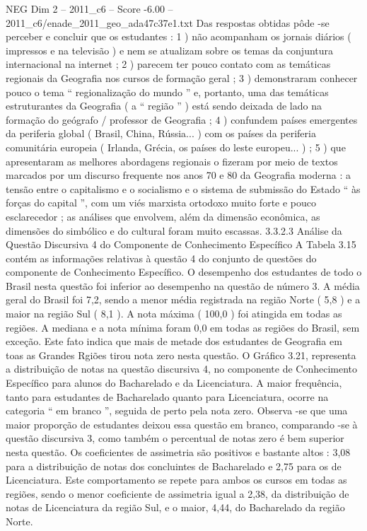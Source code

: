\begin{textsample}{NEG Dim 2 – 2011\_c6 – Score -6.00 – 2011\_c6/enade\_2011\_geo\_ada47c37e1.txt}
Das respostas obtidas pôde -se perceber e concluir que os estudantes : 1 ) não acompanham os jornais diários ( impressos e na televisão ) e nem se atualizam sobre os temas da conjuntura internacional na internet ; 2 ) parecem ter pouco contato com as temáticas regionais da Geografia nos cursos de formação geral ; 3 ) demonstraram conhecer pouco o tema “ regionalização do mundo ” e, portanto, uma das temáticas estruturantes da Geografia ( a “ região ” ) está sendo deixada de lado na formação do geógrafo / professor de Geografia ; 4 ) confundem países emergentes da periferia global ( Brasil, China, Rússia... ) com os países da periferia comunitária europeia ( Irlanda, Grécia, os países do leste europeu... ) ; 5 ) que apresentaram as melhores abordagens regionais o fizeram por meio de textos marcados por um discurso frequente nos anos 70 e 80 da Geografia moderna : a tensão entre o capitalismo e o socialismo e o sistema de submissão do Estado “ às forças do capital ”, com um viés marxista ortodoxo muito forte e pouco esclarecedor ; as análises que envolvem, além da dimensão econômica, as dimensões do simbólico e do cultural foram muito escassas. 3.3.2.3 Análise da Questão Discursiva 4 do Componente de Conhecimento Específico A Tabela 3.15 contém as informações relativas à questão 4 do conjunto de questões do componente de Conhecimento Específico.
O desempenho dos estudantes de todo o Brasil nesta questão foi inferior ao desempenho na questão de número 3.
A média geral do Brasil foi 7,2, sendo a menor média registrada na região Norte ( 5,8 ) e a maior na região Sul ( 8,1 ).
A nota máxima ( 100,0 ) foi atingida em todas as regiões.
A mediana e a nota mínima foram 0,0 em todas as regiões do Brasil, sem exceção.
Este fato indica que mais de metade dos estudantes de Geografia em toas as Grandes Rgiões tirou nota zero nesta questão.
O Gráfico 3.21, representa a distribuição de notas na questão discursiva 4, no componente de Conhecimento Específico para alunos do Bacharelado e da Licenciatura.
A maior frequência, tanto para estudantes de Bacharelado quanto para Licenciatura, ocorre na categoria “ em branco ”, seguida de perto pela nota zero.
Observa -se que uma maior proporção de estudantes deixou essa questão em branco, comparando -se à questão discursiva 3, como também o percentual de notas zero é bem superior nesta questão.
Os coeficientes de assimetria são positivos e bastante altos : 3,08 para a distribuição de notas dos concluintes de Bacharelado e 2,75 para os de Licenciatura.
Este comportamento se repete para ambos os cursos em todas as regiões, sendo o menor coeficiente de assimetria igual a 2,38, da distribuição de notas de Licenciatura da região Sul, e o maior, 4,44, do Bacharelado da região Norte.

\end{textsample}

